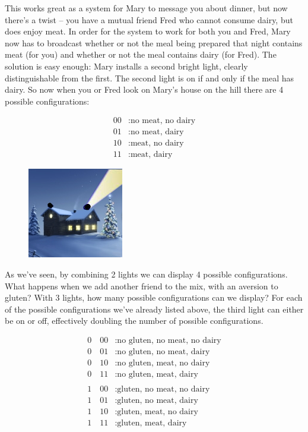 \documentclass{book}
\begin{document}
This works great as a system for Mary to message you about dinner, but now there's a twist -- you have a mutual friend Fred who cannot consume dairy, but does enjoy meat. In order for the system to work for both you and Fred, Mary now has to broadcast whether or not the meal being prepared that night contains meat (for you) and whether or not the meal contains dairy (for Fred). The solution is easy enough: Mary installs a second bright light, clearly distinguishable from the first. The second light is on if and only if the meal has dairy. So now when you or Fred look on Mary's house on the hill there are 4 possible configurations:

\begin{align*}
	00&: \text{no meat, no dairy} \\
	01&: \text{no meat, dairy} \\
	10&: \text{meat, no dairy} \\
	11&: \text{meat, dairy}
\end{align*}

\begin{figure}[H]
\captionsetup{labelformat=empty}
\centering
\includegraphics[width=0.25\linewidth]{house_on_hill_01}
\end{figure}

As we've seen, by combining 2 lights we can display 4 possible configurations. What happens when we add another friend to the mix, with an aversion to gluten? With 3 lights, how many possible configurations can we display? For each of the possible configurations we've already listed above, the third light can either be on or off, effectively doubling the number of possible configurations.

\begin{align*}
	0\quad00&: \text{no gluten, no meat, no dairy} \\
	0\quad 01&: \text{no gluten, no meat, dairy} \\
	0\quad 10&: \text{no gluten, meat, no dairy} \\
	0\quad 11&: \text{no gluten, meat, dairy} \\
          \\
	1\quad 00&: \text{gluten, no meat, no dairy} \\
	1\quad 01&: \text{gluten, no meat, dairy} \\
	1\quad 10&: \text{gluten, meat, no dairy} \\
	1\quad 11&: \text{gluten, meat, dairy}
\end{align*}
\end{document}
